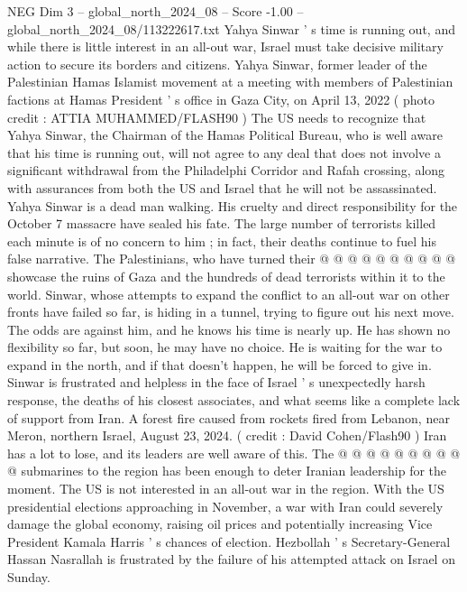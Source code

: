 \begin{textsample}{NEG Dim 3 – global\_north\_2024\_08 – Score -1.00 – global\_north\_2024\_08/113222617.txt}  \label{ex:f3_neg_323}
Yahya Sinwar ' s time is running out, and while there is little interest in an all-out war, Israel must take decisive military action to secure its borders and citizens.
Yahya Sinwar, former leader of the Palestinian Hamas Islamist movement at a meeting with members of Palestinian factions at Hamas President ' s office in Gaza City, on April 13, 2022 ( photo credit : ATTIA MUHAMMED/FLASH90 ) The US needs to recognize that Yahya Sinwar, the Chairman of the Hamas Political Bureau, who is well aware that his time is running out, will not agree to any deal that does not involve a significant withdrawal from the Philadelphi Corridor and Rafah crossing, along with assurances from both the US and Israel that he will not be assassinated.
Yahya Sinwar is a dead man walking.
His cruelty and direct responsibility for the October 7 massacre have sealed his fate.
The large number of terrorists killed each minute is of no concern to him ; in fact, their deaths continue to fuel his false narrative.
The Palestinians, who have turned their @ @ @ @ @ @ @ @ @ @ showcase the ruins of Gaza and the hundreds of dead terrorists within it to the world.
Sinwar, whose attempts to expand the conflict to an all-out war on other fronts have failed so far, is hiding in a tunnel, trying to figure out his next move.
The odds are against him, and he knows his time is nearly up.
He has shown no flexibility so far, but soon, he may have no choice.
He is waiting for the war to expand in the north, and if that doesn't happen, he will be forced to give in.
Sinwar is frustrated and helpless in the face of Israel ' s unexpectedly harsh response, the deaths of his closest associates, and what seems like a complete lack of support from Iran.
A forest fire caused from rockets fired from Lebanon, near Meron, northern Israel, August 23, 2024. ( credit : David Cohen/Flash90 ) Iran has a lot to lose, and its leaders are well aware of this.
The @ @ @ @ @ @ @ @ @ @ submarines to the region has been enough to deter Iranian leadership for the moment.
The US is not interested in an all-out war in the region.
With the US presidential elections approaching in November, a war with Iran could severely damage the global economy, raising oil prices and potentially increasing Vice President Kamala Harris ' s chances of election.
Hezbollah ' s Secretary-General Hassan Nasrallah is frustrated by the failure of his attempted attack on Israel on Sunday.

\end{textsample}
